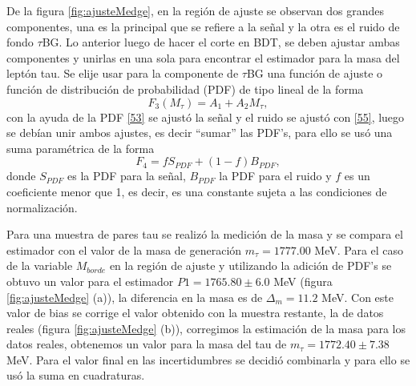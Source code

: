De la figura \ref{fig:ajusteMedge}, en la región de ajuste se observan dos grandes componentes, una es la principal que se refiere a la señal y la otra es el ruido de fondo \(\tau\)BG. Lo anterior luego de hacer el corte en BDT, se deben ajustar ambas componentes y unirlas en una sola para encontrar el estimador para la masa del leptón tau. Se elije usar para la componente de \(\tau\)BG una función de ajuste o función de distribución de probabilidad (PDF) de tipo lineal de la forma
\begin{equation}
    F_3(M_{\tau})=A_1+A_2M_{\tau}, \label{55}
\end{equation}
con la ayuda de la PDF \ref{53} se ajustó la señal y el ruido se ajustó con \ref{55}, luego se debían unir ambos ajustes, es decir ``sumar'' las PDF's, para ello se usó una suma paramétrica de la forma
\begin{equation}
    F_{4}=fS_{PDF}+(1-f)B_{PDF},
\end{equation}
donde \(S_{PDF}\) es la PDF para la señal, \(B_{PDF}\) la PDF para el ruido y \(f\) es un coeficiente menor que 1, es decir, es una constante sujeta a las condiciones de normalización.


Para una muestra de pares tau se realizó la medición de la masa y se compara el estimador con el valor de la masa de generación \(m_{\tau}=1777.00\) MeV. Para el caso de la variable \(M_{borde}\) en la región de ajuste y utilizando la adición de PDF's se obtuvo un valor para el estimador \(P1=1765.80\pm6.0\) MeV (figura \ref{fig:ajusteMedge} (a)), la diferencia en la masa es de \(\Delta_{m}=11.2\) MeV. Con este valor de bias se corrige el valor obtenido con la muestra restante, la de datos reales (figura \ref{fig:ajusteMedge} (b)), corregimos la estimación de la masa para los datos reales, obtenemos un valor para la masa del tau de \(m_{\tau} = 1772.40\pm 7.38\) MeV. Para el valor final en las incertidumbres se decidió combinarla y para ello se usó la suma en cuadraturas. 

